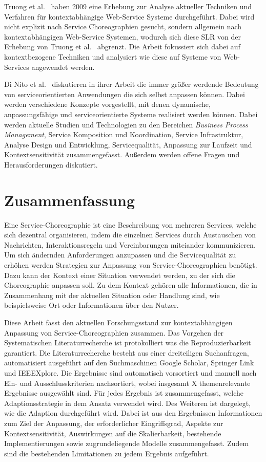 \documentclass[conference,compsoc]{IEEEtran}
\begin{document}
Truong et al.~\cite{truong2009survey} haben 2009 eine Erhebung zur Analyse aktueller Techniken und Verfahren für kontextabhängige Web-Service Systeme durchgeführt. Dabei wird nicht explizit nach Service Choreographien gesucht, sondern allgemein nach kontextabhängigen Web-Service Systemen, wodurch sich diese SLR von der Erhebung von Truong et al.~\cite{truong2009survey} abgrenzt. Die Arbeit fokussiert sich dabei auf kontextbezogene Techniken und analysiert wie diese auf Systeme von Web-Services angewendet werden.

Di Nito et al.~\cite{di2008journey} diskutieren in ihrer Arbeit die immer größer werdende Bedeutung von serviceorientierten Anwendungen die sich selbst anpassen können. Dabei werden verschiedene Konzepte vorgestellt, mit denen dynamische, anpassungsfähige und serviceorientierte Systeme realisiert werden können. Dabei werden aktuelle Studien und Technologien zu den Bereichen \textit{Business Process Management}, Service Komposition und Koordination, Service Infrastruktur, Analyse Design und Entwicklung, Servicequalität, Anpassung zur Laufzeit und Kontextsensitivität zusammengefasst. Außerdem werden offene Fragen und Herausforderungen diskutiert.

\section{Zusammenfassung}
Eine Service-Choreographie ist eine Beschreibung von mehreren Services, welche sich dezentral organisieren, indem die einzelnen Services durch Austauschen von Nachrichten, Interaktionsregeln und Vereinbarungen miteiander kommunizieren. Um sich ändernden Anforderungen anzupassen und die Servicequalität zu erhöhen werden Strategien zur Anpassung von Service-Choreographien benötigt. Dazu kann der Kontext einer Situation verwendet werden, zu der sich die Choreographie anpassen soll. Zu dem Kontext gehören alle Informationen, die in Zusammenhang mit der aktuellen Situation oder Handlung sind, wie beispielsweise Ort oder Informationen über den Nutzer.

Diese Arbeit fasst den aktuellen Forschungsstand zur kontextabhängigen Anpassung von Service-Choreographien zusammen. Das Vorgehen der Systematischen Literaturrecherche ist protokolliert was die Reproduzierbarkeit garantiert. Die Literaturrecherche besteht aus einer dreiteiligen Suchanfragen, automatisiert ausgeführt auf den Suchmaschinen Google Scholar, Springer Link und IEEEXplore. Die Ergebnisse sind automatisch vorsortiert und manuell nach Ein- und Ausschlusskriterien nachsortiert, wobei insgesamt X %
themenrelevante Ergebnisse ausgewählt sind. Für jedes Ergebnis ist zusammengefasst, welche Adaptionsstrategie in dem Ansatz verwendet wird. Des Weiteren ist dargelegt, wie die Adaption durchgeführt wird. Dabei ist aus den Ergebnissen Informationen zum Ziel der Anpassung, der erforderlicher Eingriffsgrad, Aspekte zur Kontextsensitivität, Auswirkungen auf die Skalierbarkeit, bestehende Implementierungen sowie zugrundeliegende Modelle zusammengefasst. Zudem sind die bestehenden Limitationen zu jedem Ergebnis aufgeführt.
\end{document}
